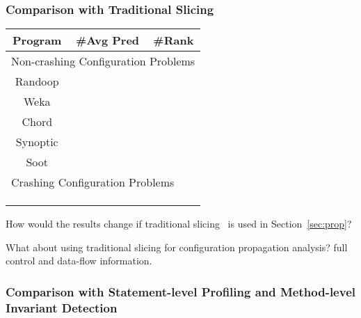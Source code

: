 \subsubsection{Comparison with Traditional Slicing}
\begin{table}[t]
\setlength{\tabcolsep}{.84\tabcolsep}
\begin{tabular}{|c|c|c|}
\hline
 Program &  \#Avg Pred & \#Rank \\
 \hline
\hline
\multicolumn{3}{|l|}{Non-crashing Configuration Problems}   \\
 \hline
 Randoop & &    \\
\hline
 Weka &  &   \\
\hline
 Chord & & \\
\hline
 Synoptic & &  \\
\hline
 Soot &  &    \\
\hline
\hline
\multicolumn{3}{|l|}{Crashing Configuration Problems}   \\
\hline
& & \\
\hline
& & \\
\hline
& & \\
\hline
\end{tabular}

\end{table}

How would the results change if traditional slicing~\cite{Horwitz:1988} is used
in Section~\ref{sec:prop}?

What about using traditional slicing for configuration propagation analysis?
full control and data-flow information.

\subsubsection{Comparison with Statement-level Profiling and Method-level Invariant Detection}

